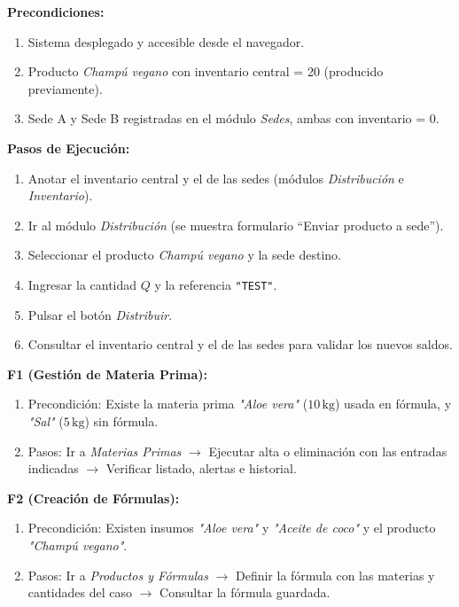 \documentclass[11pt,a4paper]{article}
\begin{document}
\begin{tcolorbox}[colback=lightgray,colframe=secondary,title=\textbf{Procedimiento F4: Traslado de Productos a Sedes}]
\textbf{Precondiciones:}
\begin{enumerate}[noitemsep]
    \item Sistema desplegado y accesible desde el navegador.
    \item Producto \textit{Champú vegano} con inventario central = 20 (producido previamente).
    \item Sede A y Sede B registradas en el módulo \textit{Sedes}, ambas con inventario = 0.
\end{enumerate}
\textbf{Pasos de Ejecución:}
\begin{enumerate}[noitemsep]
    \item Anotar el inventario central y el de las sedes (módulos \textit{Distribución} e \textit{Inventario}).
    \item Ir al módulo \textit{Distribución} (se muestra formulario ``Enviar producto a sede'').
    \item Seleccionar el producto \textit{Champú vegano} y la sede destino.
    \item Ingresar la cantidad $Q$ y la referencia \texttt{"TEST"}.
    \item Pulsar el botón \textit{Distribuir}.
    \item Consultar el inventario central y el de las sedes para validar los nuevos saldos.
\end{enumerate}
\end{tcolorbox}

\begin{tcolorbox}[colback=lightgray,colframe=secondary,title=\textbf{Procedimiento F1 y F2: Materias Primas y Fórmulas}]
\textbf{F1 (Gestión de Materia Prima):}
\begin{enumerate}[noitemsep]
    \item Precondición: Existe la materia prima \textit{"Aloe vera"} ($10\,\text{kg}$) usada en fórmula, y \textit{"Sal"} ($5\,\text{kg}$) sin fórmula.
    \item Pasos: Ir a \textit{Materias Primas} $\rightarrow$ Ejecutar alta o eliminación con las entradas indicadas $\rightarrow$ Verificar listado, alertas e historial.
\end{enumerate}
\textbf{F2 (Creación de Fórmulas):}
\begin{enumerate}[noitemsep]
    \item Precondición: Existen insumos \textit{"Aloe vera"} y \textit{"Aceite de coco"} y el producto \textit{"Champú vegano"}.
    \item Pasos: Ir a \textit{Productos y Fórmulas} $\rightarrow$ Definir la fórmula con las materias y cantidades del caso $\rightarrow$ Consultar la fórmula guardada.
\end{enumerate}
\end{tcolorbox}
\end{document}
